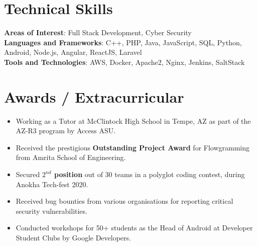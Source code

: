\documentclass[letterpaper,11pt]{article}
\newcommand{\resumeItem}[1]{
  \item\small{
    {#1 \vspace{-2pt}}
  }
}
\newcommand{\resumeItemListStart}{\begin{itemize}}
\newcommand{\resumeItemListEnd}{\end{itemize}\vspace{-5pt}}
\begin{document}
%
\section{Technical Skills}
 \begin{itemize}[leftmargin=0.15in, label={}]
    \small{\item{
    \textbf{Areas of Interest}{: Full Stack Development, Cyber Security} \\
     \textbf{Languages and Frameworks}{: C++, PHP, Java, JavaScript, SQL, Python, Android, Node.js, Angular, ReactJS, Laravel} \\
     \textbf{Tools and Technologies}{: AWS, Docker, Apache2, Nginx, Jenkins, SaltStack} \\
    }}
 \end{itemize}
 \vspace{-16pt}


\section{Awards / Extracurricular}
            \resumeItemListStart
                        	\resumeItem{Working as a Tutor at McClintock High School in Tempe, AZ as part of the AZ-R3 program by Access ASU.}\vspace{-5pt}
            	\resumeItem{Received the prestigious \textbf{Outstanding Project Award} for Flowgramming from Amrita School of Engineering.}\vspace{-5pt}
                \resumeItem{Secured \textbf{{$2^{nd}$} position} out of 30 teams in a polyglot coding contest, during Anokha Tech-fest 2020.}\vspace{-5pt}
                \resumeItem{Received bug bounties from various organisations for reporting critical security vulnerabilities.}\vspace{-5pt}
                \resumeItem{Conducted workshops for 50+ students as the Head of Android at Developer Student Clubs by Google Developers.}\vspace{-5pt}
            \resumeItemListEnd
\end{document}
